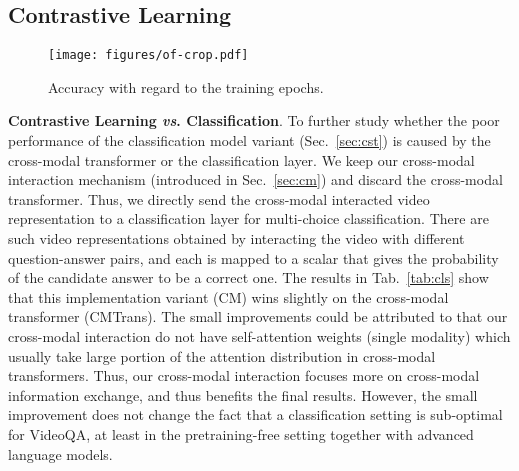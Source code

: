 \documentclass[10pt,journal,compsoc]{IEEEtran}
\newcommand{\vs}{\textit{vs}. }
\begin{document}
\subsection{Contrastive Learning}
\label{app:cst}
\begin{figure*}[t!]
  \begin{center}
    \texttt{[image: figures/of-crop.pdf]}
  \end{center}
   \vspace{-0.5em}
  \caption{Accuracy with regard to the training epochs.}
  \vspace{-0.4cm}
  \label{fig:of}
\end{figure*}
\textbf{Contrastive Learning \vs Classification}. 
To further study whether the poor performance of the classification model variant (Sec.~\ref{sec:cst}) is caused by the cross-modal transformer or the classification layer. We keep our cross-modal interaction mechanism (introduced in Sec.~\ref{sec:cm}) and discard the cross-modal transformer. Thus, we directly send the cross-modal interacted video representation  to a classification layer for multi-choice classification.
There are  such video representations obtained by interacting the video with different question-answer pairs, and each is mapped to a scalar that gives the probability of the candidate answer to be a correct one. The results in Tab.~\ref{tab:cls} show that this implementation variant (CM) wins slightly on the cross-modal transformer (CMTrans). The small improvements could be attributed to that our cross-modal interaction do not have self-attention weights (single modality) which usually take large portion of the attention distribution in cross-modal transformers. Thus, our cross-modal interaction focuses more on cross-modal information exchange, and thus benefits the final results. However, the small improvement does not change the fact that a classification setting is sub-optimal for VideoQA, at least in the pretraining-free setting together with advanced language models.
\setlength{\tabcolsep}{4pt}
\begin{table}[t!]
    \small
    \centering
    \caption{A detailed study of the classification model variants.
    }
    \label{tab:cls}
    \vspace{-0.5em}
\end{table}
\end{document}
